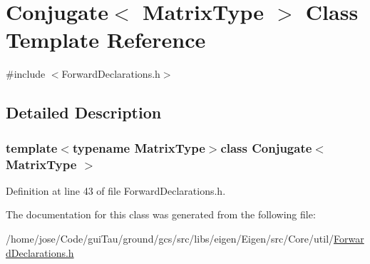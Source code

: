\hypertarget{class_conjugate}{\section{Conjugate$<$ Matrix\-Type $>$ Class Template Reference}
\label{class_conjugate}
}


{\ttfamily \#include $<$Forward\-Declarations.\-h$>$}



\subsection{Detailed Description}
\subsubsection*{template$<$typename Matrix\-Type$>$class Conjugate$<$ Matrix\-Type $>$}



Definition at line 43 of file Forward\-Declarations.\-h.



The documentation for this class was generated from the following file\-:\begin{DoxyCompactItemize}
\item 
/home/jose/\-Code/gui\-Tau/ground/gcs/src/libs/eigen/\-Eigen/src/\-Core/util/\hyperlink{_forward_declarations_8h}{Forward\-Declarations.\-h}\end{DoxyCompactItemize}
